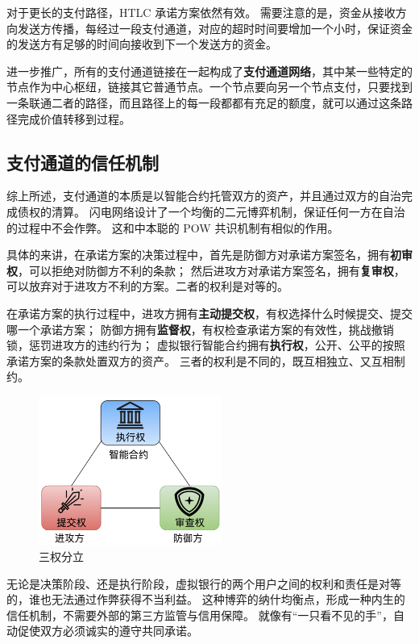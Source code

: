 对于更长的支付路径，HTLC 承诺方案依然有效。
需要注意的是，资金从接收方向发送方传播，每经过一段支付通道，对应的超时时间要增加一个小时，保证资金的发送方有足够的时间向接收到下一个发送方的资金。

进一步推广，所有的支付通道链接在一起构成了\textbf{支付通道网络}，其中某一些特定的节点作为中心枢纽，链接其它普通节点。一个节点要向另一个节点支付，只要找到一条联通二者的路径，而且路径上的每一段都都有充足的额度，就可以通过这条路径完成价值转移到过程。

\subsection{支付通道的信任机制}
综上所述，支付通道的本质是以智能合约托管双方的资产，并且通过双方的自治完成债权的清算。
闪电网络设计了一个均衡的二元博弈机制，保证任何一方在自治的过程中不会作弊。
这和中本聪的 POW 共识机制有相似的作用。

具体的来讲，在承诺方案的决策过程中，首先是防御方对承诺方案签名，拥有\textbf{初审权}，可以拒绝对防御方不利的条款；
然后进攻方对承诺方案签名，拥有\textbf{复审权}，可以放弃对于进攻方不利的方案。二者的权利是对等的。

在承诺方案的执行过程中，进攻方拥有\textbf{主动提交权}，有权选择什么时候提交、提交哪一个承诺方案；
防御方拥有\textbf{监督权}，有权检查承诺方案的有效性，挑战撤销锁，惩罚进攻方的违约行为；
虚拟银行智能合约拥有\textbf{执行权}，公开、公平的按照承诺方案的条款处置双方的资产。
三者的权利是不同的，既互相独立、又互相制约。

\begin{figure}[h!]
    \centering
    \includegraphics[width=6cm, keepaspectratio]{../images/trias.png}
    \caption{三权分立}
    \label{fig:trias}
\end{figure}

无论是决策阶段、还是执行阶段，虚拟银行的两个用户之间的权利和责任是对等的，谁也无法通过作弊获得不当利益。
这种博弈的纳什均衡点，形成一种内生的信任机制，不需要外部的第三方监管与信用保障。
就像有“一只看不见的手”，自动促使双方必须诚实的遵守共同承诺。


